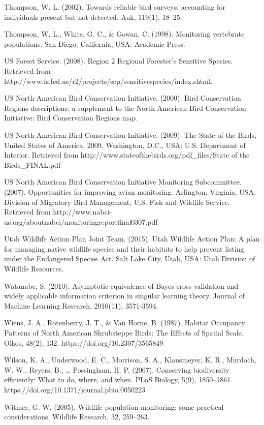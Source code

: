 \documentclass[
  letterpaper,
  DIV=11,
  numbers=noendperiod,
  oneside]{scrreprt}
\begin{document}
Thompson, W. L. (2002). Towards reliable bird surveys: accounting for
individuals present but not detected. Auk, 119(1), 18--25.

Thompson, W. L., White, G. C., \& Gowan, C. (1998). Monitoring
vertebrate populations. San Diego, California, USA: Academic Press.

US Forest Service. (2008). Region 2 Regional Forester's Sensitive
Species. Retrieved from
http://www.fs.fed.us/r2/projects/scp/sensitivespecies/index.shtml.

US North American Bird Conservation Initiative. (2000). Bird
Conservation Regions descriptions: a supplement to the North American
Bird Conservation Initiative: Bird Conservation Regions map.

US North American Bird Conservation Initiative. (2009). The State of the
Birds, United States of America, 2009. Washington, D.C., USA: U.S.
Department of Interior. Retrieved from
http://www.stateofthebirds.org/pdf\_files/State of the Birds\_FINAL.pdf

US North American Bird Conservation Initiative Monitoring Subcommittee.
(2007). Opportunities for improving avian monitoring. Arlington,
Virginia, USA: Division of Migratory Bird Management, U.S. Fish and
Wildlife Service. Retrieved from
http://www.nabci-us.org/aboutnabci/monitoringreportfinal0307.pdf

Utah Wildlife Action Plan Joint Team. (2015). Utah Wildlife Action Plan:
A plan for managing native wildlife species and their habitats to help
prevent listing under the Endangered Species Act. Salt Lake City, Utah,
USA: Utah Division of Wildlife Resources.

Watanabe, S. (2010). Asymptotic equivalence of Bayes cross validation
and widely applicable information criterion in singular learning theory.
Journal of Machine Learning Research, 2010(11), 3571-3594.

Wiens, J. A., Rotenberry, J. T., \& Van Horne, B. (1987). Habitat
Occupancy Patterns of North American Shrubsteppe Birds: The Effects of
Spatial Scale. Oikos, 48(2), 132. https://doi.org/10.2307/3565849

Wilson, K. A., Underwood, E. C., Morrison, S. A., Klausmeyer, K. R.,
Murdoch, W. W., Reyers, B., \ldots{} Possingham, H. P. (2007).
Conserving biodiversity efficiently: What to do, where, and when. PLoS
Biology, 5(9), 1850--1861. https://doi.org/10.1371/journal.pbio.0050223

Witmer, G. W. (2005). Wildlife population monitoring: some practical
considerations. Wildlife Research, 32, 259--263.
\end{document}
